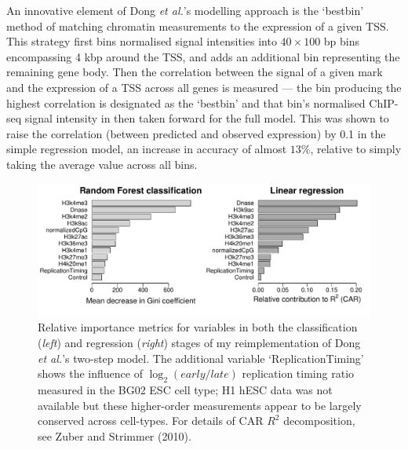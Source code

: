 \documentclass[a4paper,11pt,oneside]{book}
\begin{document}
An innovative element of Dong \emph{et al.}'s modelling approach is the `bestbin' method of matching
chromatin measurements to the expression of a given TSS. This strategy
first bins normalised signal intensities into $40 \times 100$ bp bins
encompassing 4 kbp around the TSS, and adds an additional bin representing the remaining
gene body. Then the correlation between
the signal of a given mark and the expression of a TSS across all
genes is measured --- the bin producing the highest correlation is
designated as the `bestbin' and that bin's normalised ChIP-seq signal intensity in then
taken forward for the full model. This was shown to raise
the correlation (between predicted and observed expression) by 0.1 in
the simple regression model, an increase in accuracy of almost $13\%$,
relative to simply taking the average value across all
bins.\cite{Dong2012} 

\begin{figure}
\begin{center}
\includegraphics[width=\textwidth]{figs/Dong_relImp_Horiz.pdf}
\captionsetup{width=.9\textwidth}
\caption{Relative importance metrics for variables in both the
  classification (\emph{left}) and regression (\emph{right}) stages of
  my reimplementation of Dong \emph{et al.}'s two-step
  model.\cite{Dong2012} The additional variable `ReplicationTiming'
  shows the influence of $\log_2 (early/late)$ replication timing ratio measured in the BG02 ESC cell type;\cite{Ryba2010}
  H1 hESC data was not available but these higher-order measurements
  appear to be largely conserved across cell-types.\cite{Chambers2012}
  For details of CAR $R^2$ decomposition, see Zuber and Strimmer (2010).\cite{Zuber2011}
}\label{fig:relimp}
\end{center} 
\end{figure} 
\end{document}
